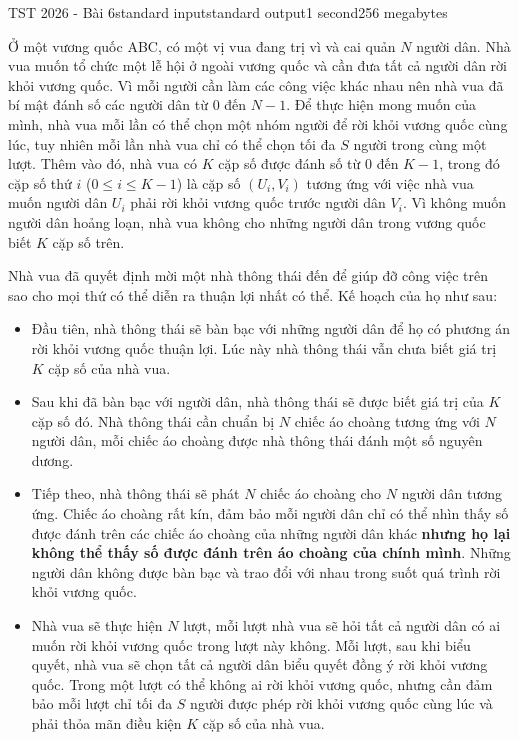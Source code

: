 \begin{problem}{TST 2026 - Bài 6}{standard input}{standard output}{1 second}{256 megabytes}

Ở một vương quốc ABC, có một vị vua đang trị vì và cai quản $N$ người dân. Nhà vua muốn tổ chức một lễ hội ở ngoài vương quốc và cần đưa tất cả người dân rời khỏi vương quốc. Vì mỗi người cần làm các công việc khác nhau nên nhà vua đã bí mật đánh số các người dân từ $0$ đến $N-1$. Để thực hiện mong muốn của mình, nhà vua mỗi lần có thể chọn một nhóm người để rời khỏi vương quốc cùng lúc, tuy nhiên mỗi lần nhà vua chỉ có thể chọn tối đa $S$ người trong cùng một lượt. Thêm vào đó, nhà vua có $K$ cặp số được đánh số từ $0$ đến $K-1$, trong đó cặp số thứ $i$ ($0\le i\le K-1$) là cặp số $(U_i,V_i)$ tương ứng với việc nhà vua muốn người dân $U_i$ phải rời khỏi vương quốc trước người dân $V_i$. Vì không muốn người dân hoảng loạn, nhà vua không cho những người dân trong vương quốc biết $K$ cặp số trên.

Nhà vua đã quyết định mời một nhà thông thái đến để giúp đỡ công việc trên sao cho mọi thứ có thể diễn ra thuận lợi nhất có thể. Kế hoạch của họ như sau:
\begin{itemize}
   \item Đầu tiên, nhà thông thái sẽ bàn bạc với những người dân để họ có phương án rời khỏi vương quốc thuận lợi. Lúc này nhà thông thái vẫn chưa biết giá trị $K$ cặp số của nhà vua.
   \item Sau khi đã bàn bạc với người dân, nhà thông thái sẽ được biết giá trị của $K$ cặp số đó. Nhà thông thái cần chuẩn bị $N$ chiếc áo choàng tương ứng với $N$ người dân, mỗi chiếc áo choàng được nhà thông thái đánh một số nguyên dương.
   \item Tiếp theo, nhà thông thái sẽ phát $N$ chiếc áo choàng cho $N$ người dân tương ứng. Chiếc áo choàng rất kín, đảm bảo mỗi người dân chỉ có thể nhìn thấy số được đánh trên các chiếc áo choàng của những người dân khác \textbf{nhưng họ lại không thể thấy số được đánh trên áo choàng của chính mình}. Những người dân không được bàn bạc và trao đổi với nhau trong suốt quá trình rời khỏi vương quốc.
   \item Nhà vua sẽ thực hiện $N$ lượt, mỗi lượt nhà vua sẽ hỏi tất cả người dân có ai muốn rời khỏi vương quốc trong lượt này không. Mỗi lượt, sau khi biểu quyết, nhà vua sẽ chọn tất cả người dân biểu quyết đồng ý rời khỏi vương quốc. Trong một lượt có thể không ai rời khỏi vương quốc, nhưng cần đảm bảo mỗi lượt chỉ tối đa $S$ người được phép rời khỏi vương quốc cùng lúc và phải thỏa mãn điều kiện $K$ cặp số của nhà vua.
\end{itemize}


\end{problem}
